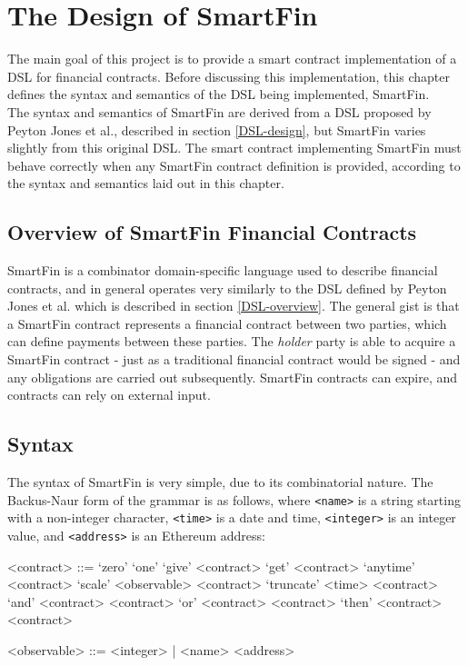 \chapter{The Design of SmartFin} \label{combinator-DSL}

The main goal of this project is to provide a smart contract implementation of a DSL for financial contracts. Before discussing this implementation, this chapter defines the syntax and semantics of the DSL being implemented, SmartFin. \\

The syntax and semantics of SmartFin are derived from a DSL proposed by Peyton Jones et al.\cite{SPJ}, described in section \ref{DSL-design}, but SmartFin varies slightly from this original DSL. The smart contract implementing SmartFin must behave correctly when any SmartFin contract definition is provided, according to the syntax and semantics laid out in this chapter.


\section{Overview of SmartFin Financial Contracts}

SmartFin is a combinator domain-specific language used to describe financial contracts, and in general operates very similarly to the DSL defined by Peyton Jones et al.\cite{SPJ} which is described in section \ref{DSL-overview}. The general gist is that a SmartFin contract represents a financial contract between two parties, which can define payments between these parties. The \textit{holder} party is able to acquire a SmartFin contract - just as a traditional financial contract would be signed - and any obligations are carried out subsequently. SmartFin contracts can expire, and contracts can rely on external input.


\section{Syntax} \label{DSL-BNF}

The syntax of SmartFin is very simple, due to its combinatorial nature. The Backus-Naur form of the grammar is as follows, where \texttt{<name>} is a string starting with a non-integer character, \texttt{<time>} is a date and time, \texttt{<integer>} is an integer value, and \texttt{<address>} is an Ethereum address: \\

\setlength{\grammarindent}{10em}
\begin{grammar}
<contract> ::= `zero'
\alt `one'
\alt `give' <contract>
\alt `get' <contract>
\alt `anytime' <contract>
\alt `scale' <observable> <contract>
\alt `truncate' <time> <contract>
\alt `and' <contract> <contract>
\alt `or' <contract> <contract>
\alt `then' <contract> <contract>

<observable> ::= <integer> | <name> <address>
\end{grammar}

